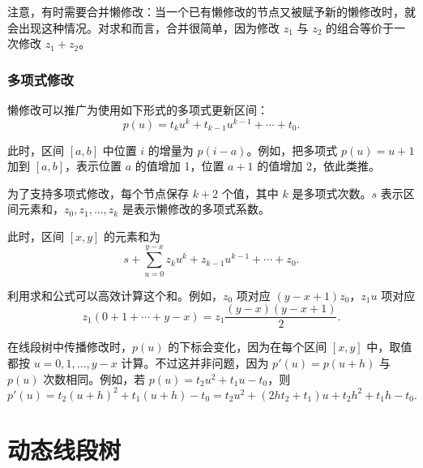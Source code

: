 \begin{center}
\end{center}

注意，有时需要合并懒修改：当一个已有懒修改的节点又被赋予新的懒修改时，就会出现这种情况。对求和而言，合并很简单，因为修改 $z_1$ 与 $z_2$ 的组合等价于一次修改 $z_1+z_2$。

\subsubsection{多项式修改}

懒修改可以推广为使用如下形式的多项式更新区间：
\[p(u) = t_k u^k + t_{k-1} u^{k-1} + \cdots + t_0.\]

此时，区间 $[a,b]$ 中位置 $i$ 的增量为 $p(i-a)$。例如，把多项式 $p(u)=u+1$ 加到 $[a,b]$，表示位置 $a$ 的值增加 1，位置 $a+1$ 的值增加 2，依此类推。

为了支持多项式修改，每个节点保存 $k+2$ 个值，其中 $k$ 是多项式次数。$s$ 表示区间元素和，$z_0,z_1,\ldots,z_k$ 是表示懒修改的多项式系数。

此时，区间 $[x,y]$ 的元素和为
\[s+\sum_{u=0}^{y-x} z_k u^k + z_{k-1} u^{k-1} + \cdots + z_0.\]

利用求和公式可以高效计算这个和。例如，$z_0$ 项对应 $(y-x+1)z_0$，$z_1 u$ 项对应
\[z_1(0+1+\cdots+y-x) = z_1 \frac{(y-x)(y-x+1)}{2} .\]

在线段树中传播修改时，$p(u)$ 的下标会变化，因为在每个区间 $[x,y]$ 中，取值都按 $u=0,1,\ldots,y-x$ 计算。不过这并非问题，因为 $p'(u)=p(u+h)$ 与 $p(u)$ 次数相同。例如，若 $p(u)=t_2 u^2+t_1 u-t_0$，则
\[p'(u)=t_2(u+h)^2+t_1(u+h)-t_0=t_2 u^2 + (2ht_2+t_1)u+t_2h^2+t_1h-t_0.\]

\section{动态线段树}

